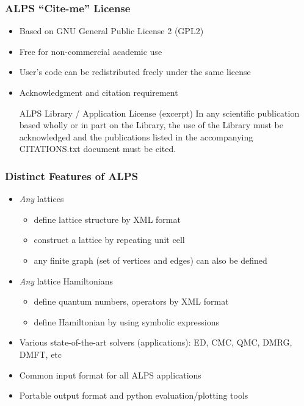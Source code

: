 \begin{frame}[t,fragile]
\frametitle{ALPS ``Cite-me'' License}
  \begin{itemize}
  \item Based on GNU General Public License 2 (GPL2)
  \item Free for non-commercial academic use
  \item User's code can be redistributed freely under the same license
  \item Acknowledgment and citation requirement
    \begin{minipage}{.9\textwidth}
    \begin{block}{ALPS Library / Application License (excerpt)}
      In any scientific publication based wholly or in part on the
      Library, the use of the Library must be acknowledged and the
      publications listed in the accompanying CITATIONS.txt document
      must be cited.
    \end{block}
    \end{minipage}
  \end{itemize}
\end{frame}

\begin{frame}[t,fragile]
  \frametitle{Distinct Features of ALPS}
  \begin{itemize}
  \item {\em Any} lattices
    \begin{itemize}
    \item define lattice structure by XML format
    \item construct a lattice by repeating unit cell
    \item any finite graph (set of vertices and edges) can also be defined
    \end{itemize}
  \item {\em Any} lattice Hamiltonians
    \begin{itemize}
    \item define quantum numbers, operators by XML format
    \item define Hamiltonian by using symbolic expressions
    \end{itemize}
  \item Various state-of-the-art solvers (applications): ED, CMC, QMC, DMRG, DMFT, etc
  \item Common input format for all ALPS applications
  \item Portable output format and python evaluation/plotting tools
  \end{itemize}
\end{frame}

